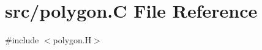 \hypertarget{polygon_8_c}{}\section{src/polygon.C File Reference}
\label{polygon_8_c}
{\ttfamily \#include $<$polygon.\+H$>$}\newline
